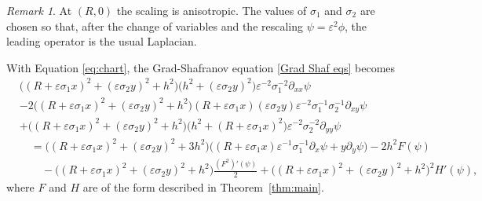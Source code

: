 \documentclass[12pt,reqno]{amsart}
\numberwithin{equation}{section}
\theoremstyle{definition}
\theoremstyle{remark}
\newtheorem{remark}[theorem]{Remark}
\begin{document}
\begin{remark}\label{rem:scale-choice}
	At $(R,0)$ the scaling is anisotropic.  The values of $\sigma_1$ and $\sigma_2$ are chosen so that, after the change of variables and the rescaling $\psi=\varepsilon^2\phi$, the leading operator is the usual Laplacian.  %
\end{remark}
With Equation \eqref{eq:chart}, the Grad-Shafranov equation \eqref{Grad Shaf eqs} becomes
\begin{equation}\label{eq:local}
\begin{split}
&\bigl((R+\varepsilon\sigma_1x)^2+(\varepsilon\sigma_2y)^2+h^2\bigr)\bigl(h^2+(\varepsilon\sigma_2y)^2\bigr)
\varepsilon^{-2}\sigma_1^{-2}\partial_{xx}\psi \\
&-2\bigl((R+\varepsilon\sigma_1x)^2+(\varepsilon\sigma_2y)^2+h^2\bigr)(R+\varepsilon\sigma_1x)(\varepsilon\sigma_2y)
\varepsilon^{-2}\sigma_1^{-1}\sigma_2^{-1}\partial_{xy}\psi\\
&+\bigl((R+\varepsilon\sigma_1x)^2+(\varepsilon\sigma_2y)^2+h^2\bigr)\bigl(h^2+(R+\varepsilon\sigma_1x)^2\bigr)
\varepsilon^{-2}\sigma_2^{-2}\partial_{yy}\psi\\
&\quad=\bigl((R+\varepsilon\sigma_1x)^2+(\varepsilon\sigma_2y)^2+3h^2\bigr)\bigl((R+\varepsilon\sigma_1x)\varepsilon^{-1}\sigma_1^{-1}\partial_{x}\psi+y\partial_{y}\psi\bigr)-2h^2F(\psi)\\
&\qquad-\bigl((R+\varepsilon\sigma_1x)^2+(\varepsilon\sigma_2y)^2+h^2\bigr) \frac{\left(F^2\right)'(\psi)}{2}+\bigl((R+\varepsilon\sigma_1x)^2+(\varepsilon\sigma_2y)^2+h^2\bigr)^2 H'(\psi),
\end{split}
\end{equation} 
where $F$ and $H$ are of the form described in Theorem~\ref{thm:main}.
\end{document}

